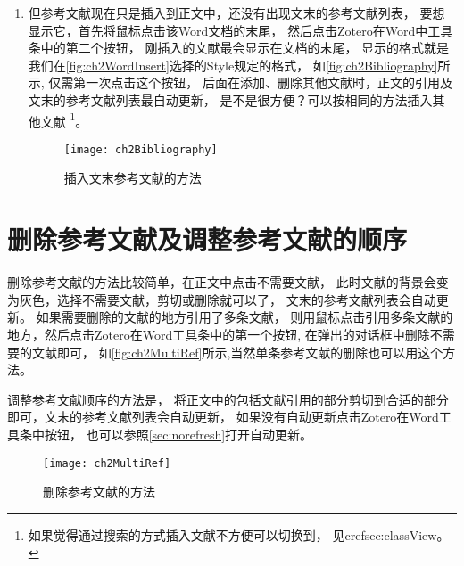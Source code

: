 \documentclass[cn,11pt,chinese]{elegantbook}
\begin{document}
\begin{enumerate}
\begin{figure}[htbp]
				\label{fig:ch2ZoteroSearch}
			\end{figure}
			\item
			但参考文献现在只是插入到正文中，还没有出现文末的参考文献列表，
			要想显示它，首先将鼠标点击该Word文档的末尾，
			然后点击Zotero在Word中工具条中的第二个按钮，
			刚插入的文献最会显示在文档的末尾，
			显示的格式就是我们在\autoref{fig:ch2WordInsert}选择的Style规定的格式，
			如\autoref{fig:ch2Bibliography}所示,
			仅需第一次点击这个按钮，
			后面在添加、删除其他文献时，正文的引用及文末的参考文献列表最自动更新，
			是不是很方便？可以按相同的方法插入其他文献
			\footnote{如果觉得通过搜索的方式插入文献不方便可以切换到，
			见cref{sec:classView}。}。
			
			\begin{figure}[htbp]
				\centering
				\texttt{[image: ch2Bibliography]}
				\caption{插入文末参考文献的方法}
				\label{fig:ch2Bibliography}
			\end{figure}
		\end{enumerate}
		\section{删除参考文献及调整参考文献的顺序}
			删除参考文献的方法比较简单，在正文中点击不需要文献，
			此时文献的背景会变为灰色，选择不需要文献，剪切或删除就可以了，
			文末的参考文献列表会自动更新。
			如果需要删除的文献的地方引用了多条文献，
			则用鼠标点击引用多条文献的地方，然后点击Zotero在Word工具条中的第一个按钮,
			在弹出的对话框中删除不需要的文献即可，
			如\autoref{fig:ch2MultiRef}所示,当然单条参考文献的删除也可以用这个方法。
			
			调整参考文献顺序的方法是，
			将正文中的包括文献引用的部分剪切到合适的部分即可，文末的参考文献列表会自动更新，
			如果没有自动更新点击Zotero在Word工具条中按钮，
			也可以参照\cref{sec:norefresh}打开自动更新。
			
			\begin{figure}[htbp]
				\centering
				\texttt{[image: ch2MultiRef]}
				\caption{删除参考文献的方法}
				\label{fig:ch2MultiRef}
			\end{figure}
\end{document}
